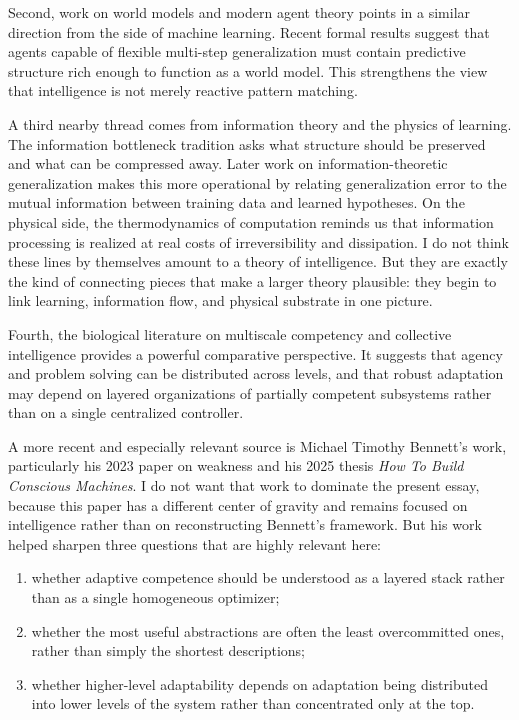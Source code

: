 \documentclass[11pt]{article}
\begin{document}
Second, work on world models and modern agent theory points in a similar direction from the side of machine learning. Recent formal results suggest that agents capable of flexible multi-step generalization must contain predictive structure rich enough to function as a world model. This strengthens the view that intelligence is not merely reactive pattern matching.

A third nearby thread comes from information theory and the physics of learning. The information bottleneck tradition asks what structure should be preserved and what can be compressed away. Later work on information-theoretic generalization makes this more operational by relating generalization error to the mutual information between training data and learned hypotheses. On the physical side, the thermodynamics of computation reminds us that information processing is realized at real costs of irreversibility and dissipation. I do not think these lines by themselves amount to a theory of intelligence. But they are exactly the kind of connecting pieces that make a larger theory plausible: they begin to link learning, information flow, and physical substrate in one picture.

Fourth, the biological literature on multiscale competency and collective intelligence provides a powerful comparative perspective. It suggests that agency and problem solving can be distributed across levels, and that robust adaptation may depend on layered organizations of partially competent subsystems rather than on a single centralized controller.

A more recent and especially relevant source is Michael Timothy Bennett's work, particularly his 2023 paper on weakness and his 2025 thesis \textit{How To Build Conscious Machines}. I do not want that work to dominate the present essay, because this paper has a different center of gravity and remains focused on intelligence rather than on reconstructing Bennett's framework. But his work helped sharpen three questions that are highly relevant here:

\begin{enumerate}
\item whether adaptive competence should be understood as a layered stack rather than as a single homogeneous optimizer;
\item whether the most useful abstractions are often the least overcommitted ones, rather than simply the shortest descriptions;
\item whether higher-level adaptability depends on adaptation being distributed into lower levels of the system rather than concentrated only at the top.
\end{enumerate}
\end{document}
